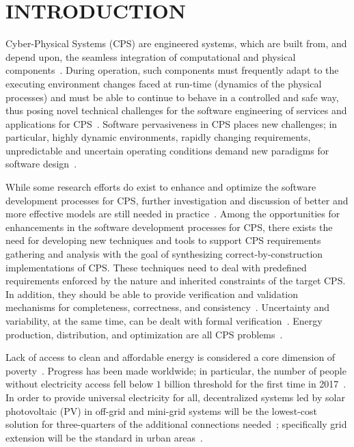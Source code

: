 \documentclass[review]{elsarticle}
\begin{document}

\section{INTRODUCTION}

Cyber-Physical Systems  (CPS) are engineered systems, which are built from, and depend upon, 
the seamless integration of computational and physical  components~\cite{NSF2015}. 
During operation, such components must frequently adapt to the executing environment changes 
faced at run-time (dynamics of the physical processes) and must be able to continue to behave 
in a controlled and safe way, thus posing novel technical challenges for the software engineering of services and applications for CPS~\cite{Metzger2014}. 
Software pervasiveness in CPS places new challenges; in particular, highly dynamic environments, rapidly changing requirements, unpredictable and uncertain operating conditions demand new paradigms for software design~\cite{Filieri2015}.

While some research efforts do exist to enhance and optimize the software development 
processes for CPS, further investigation and discussion of better and more effective models 
are still needed in practice~\cite{Al-Jaroodi2016}. Among the opportunities for enhancements 
in the software development processes for CPS, there exists the need for developing new techniques and tools to support CPS requirements gathering and analysis with the goal of synthesizing correct-by-construction implementations of CPS. These techniques need to deal with predefined requirements enforced by the nature and inherited constraints of the target CPS. In addition, they should be able to provide verification and validation mechanisms for completeness, correctness, and consistency~\cite{Al-Jaroodi2016}. Uncertainty and variability, at the same time, can be dealt with formal verification~\cite{NESSI}. Energy production, distribution, and optimization are all CPS problems~\cite{UC}. 

Lack of access to clean and affordable energy is considered a core 
dimension of poverty~\cite{Hussein2012}. Progress has been made worldwide; 
in particular, the number of people without electricity access fell below $1$ 
billion threshold for the first time in 2017~\cite{IEAweo2018}. In order to provide 
universal electricity for all, decentralized systems led by solar photovoltaic (PV) 
in off-grid and mini-grid systems will be the lowest-cost solution for three-quarters 
of the additional connections needed~\cite{Hussein2012}; 
specifically grid extension will be the standard in urban areas~\cite{IEAweo2018}.
\end{document}
